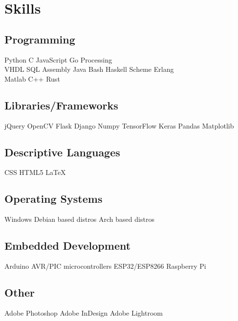 \documentclass[]{plushcv}
\begin{document}
\hfill
\begin{minipage}[t]{0.3\textwidth}


  \section{Skills}
  \subsection{Programming}
  \sectionsep
  Python \textbullet{} C \textbullet{} JavaScript \textbullet{} Go \textbullet{} Processing \\
  \sectionsep
  VHDL \textbullet{} SQL \textbullet{} Assembly \textbullet{} Java \textbullet{} Bash \textbullet{} Haskell \textbullet{} Scheme \textbullet{} Erlang \\
  \sectionsep
  Matlab \textbullet{} C++ \textbullet{} Rust \\
  \sectionsep
  \sectionsep
  \subsection{Libraries/Frameworks}
  \sectionsep
  jQuery \textbullet{} OpenCV \textbullet{} Flask \textbullet{} Django \textbullet{} Numpy \textbullet{}
  TensorFlow \textbullet{} Keras \textbullet{} Pandas \textbullet{} Matplotlib \\
  \sectionsep
  \sectionsep
  \subsection{Descriptive Languages}
  \sectionsep
  CSS \textbullet{} HTML5 \textbullet{} \LaTeX
  \sectionsep
  \subsection{Operating Systems}
  \sectionsep
  Windows \textbullet{} Debian based distros \textbullet{} Arch based distros \\
  \sectionsep
  \sectionsep
  \subsection{Embedded Development}
  \sectionsep
  Arduino \textbullet{} AVR/PIC microcontrollers \textbullet{} ESP32/ESP8266 \textbullet{} Raspberry Pi \\
  \sectionsep
  \sectionsep
  \subsection{Other}
  \sectionsep
  Adobe Photoshop \textbullet{} Adobe InDesign \textbullet{} Adobe Lightroom \\
  \sectionsep
\end{minipage}
\end{document}
